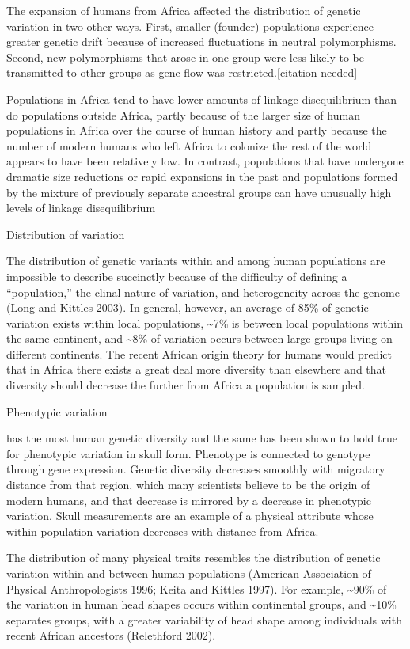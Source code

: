 The expansion of humans from Africa affected the distribution of genetic variation in two other ways. First, smaller (founder) populations experience greater genetic drift because of increased fluctuations in neutral polymorphisms. Second, new polymorphisms that arose in one group were less likely to be transmitted to other groups as gene flow was restricted.{[}citation needed{]}

Populations in Africa tend to have lower amounts of linkage disequilibrium than do populations outside Africa, partly because of the larger size of human populations in Africa over the course of human history and partly because the number of modern humans who left Africa to colonize the rest of the world appears to have been relatively low. In contrast, populations that have undergone dramatic size reductions or rapid expansions in the past and populations formed by the mixture of previously separate ancestral groups can have unusually high levels of linkage disequilibrium

Distribution of variation

The distribution of genetic variants within and among human populations are impossible to describe succinctly because of the difficulty of defining a ``population,'' the clinal nature of variation, and heterogeneity across the genome (Long and Kittles 2003). In general, however, an average of 85\% of genetic variation exists within local populations, \textasciitilde{}7\% is between local populations within the same continent, and \textasciitilde{}8\% of variation occurs between large groups living on different continents. The recent African origin theory for humans would predict that in Africa there exists a great deal more diversity than elsewhere and that diversity should decrease the further from Africa a population is sampled.

Phenotypic variation

has the most human genetic diversity and the same has been shown to hold true for phenotypic variation in skull form. Phenotype is connected to genotype through gene expression. Genetic diversity decreases smoothly with migratory distance from that region, which many scientists believe to be the origin of modern humans, and that decrease is mirrored by a decrease in phenotypic variation. Skull measurements are an example of a physical attribute whose within-population variation decreases with distance from Africa.

The distribution of many physical traits resembles the distribution of genetic variation within and between human populations (American Association of Physical Anthropologists 1996; Keita and Kittles 1997). For example, \textasciitilde{}90\% of the variation in human head shapes occurs within continental groups, and \textasciitilde{}10\% separates groups, with a greater variability of head shape among individuals with recent African ancestors (Relethford 2002).


